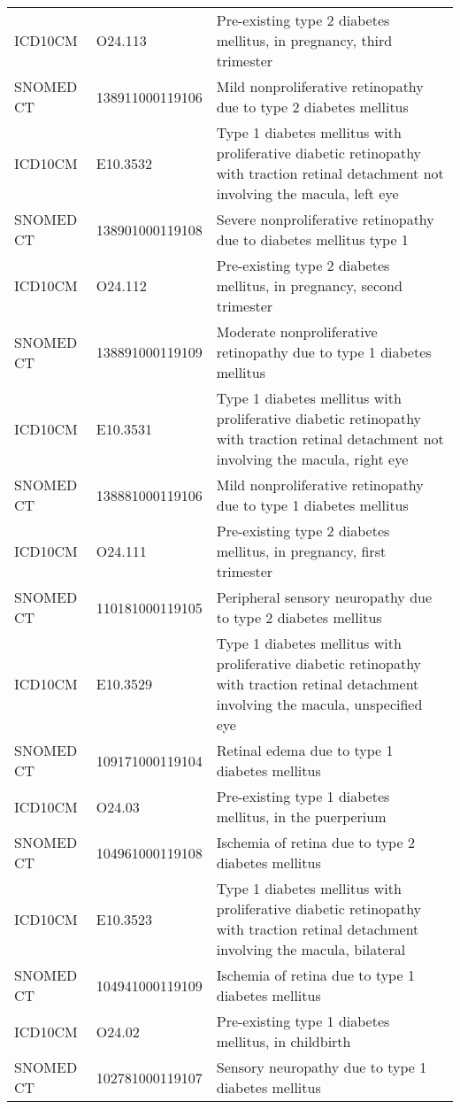 \begin{table}[ht]
\begin{tabular}{lll}
  ICD10CM & O24.113 & Pre-existing type 2 diabetes mellitus, in pregnancy, third trimester \\ 
  SNOMED CT & 138911000119106 & Mild nonproliferative retinopathy due to type 2 diabetes mellitus \\ 
  ICD10CM & E10.3532 & Type 1 diabetes mellitus with proliferative diabetic retinopathy with traction retinal detachment not involving the macula, left eye \\ 
  SNOMED CT & 138901000119108 & Severe nonproliferative retinopathy due to diabetes mellitus type 1 \\ 
  ICD10CM & O24.112 & Pre-existing type 2 diabetes mellitus, in pregnancy, second trimester \\ 
  SNOMED CT & 138891000119109 & Moderate nonproliferative retinopathy due to type 1 diabetes mellitus \\ 
  ICD10CM & E10.3531 & Type 1 diabetes mellitus with proliferative diabetic retinopathy with traction retinal detachment not involving the macula, right eye \\ 
  SNOMED CT & 138881000119106 & Mild nonproliferative retinopathy due to type 1 diabetes mellitus \\ 
  ICD10CM & O24.111 & Pre-existing type 2 diabetes mellitus, in pregnancy, first trimester \\ 
  SNOMED CT & 110181000119105 & Peripheral sensory neuropathy due to type 2 diabetes mellitus \\ 
  ICD10CM & E10.3529 & Type 1 diabetes mellitus with proliferative diabetic retinopathy with traction retinal detachment involving the macula, unspecified eye \\ 
  SNOMED CT & 109171000119104 & Retinal edema due to type 1 diabetes mellitus \\ 
  ICD10CM & O24.03 & Pre-existing type 1 diabetes mellitus, in the puerperium \\ 
  SNOMED CT & 104961000119108 & Ischemia of retina due to type 2 diabetes mellitus \\ 
  ICD10CM & E10.3523 & Type 1 diabetes mellitus with proliferative diabetic retinopathy with traction retinal detachment involving the macula, bilateral \\ 
  SNOMED CT & 104941000119109 & Ischemia of retina due to type 1 diabetes mellitus \\ 
  ICD10CM & O24.02 & Pre-existing type 1 diabetes mellitus, in childbirth \\ 
  SNOMED CT & 102781000119107 & Sensory neuropathy due to type 1 diabetes mellitus \\ 

\end{tabular}
\end{table}
